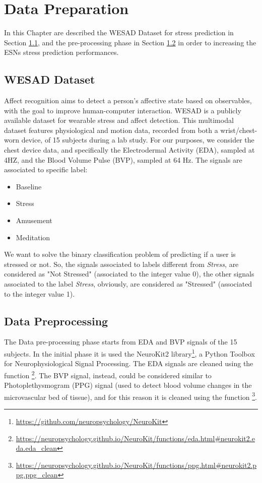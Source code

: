 \chapter{Data Preparation}\label{chapter:dataset}

In this Chapter are described the WESAD Dataset \cite{schmidt2018introducing} for stress prediction in Section \ref{sec:wesad}, and the pre-processing phase in Section \ref{sec:data_preproc} in order to  increasing the ESNs stress prediction performances.


\section{WESAD Dataset}\label{sec:wesad}

Affect recognition aims to detect a person’s affective state based on observables, with the goal to improve human-computer interaction. WESAD is a publicly available dataset for wearable stress and affect detection. This multimodal dataset features physiological and motion data, recorded from both a wrist/chest-worn device, of 15 subjects during a lab study. For our purposes, we consider the chest device data, and specifically the Electrodermal Activity (EDA), sampled at 4HZ, and the Blood Volume Pulse (BVP), sampled at 64 Hz. The signals are associated to specific label:

\begin{itemize}
    \item Baseline
    \item Stress
    \item Amusement
    \item Meditation
\end{itemize}

We want to solve the binary classification problem of predicting if a user is stressed or not. So, the signals associated to labels different from \textit{Stress}, are considered as "Not Stressed" (associated to the integer value 0), the other signals associated to the label \textit{Stress}, obviously, are considered as "Stressed" (associated to the integer value 1).


\section{Data Preprocessing}\label{sec:data_preproc}

The Data pre-processing phase starts from EDA and BVP signals of the 15 subjects. In the initial phase it is used the NeuroKit2 library\footnote{\url{https://github.com/neuropsychology/NeuroKit}}, a Python Toolbox for Neurophysiological Signal Processing. The EDA signals are cleaned using the function \footnote{\url{https://neuropsychology.github.io/NeuroKit/functions/eda.html#neurokit2.eda.eda_clean}}. The BVP signal, instead, could be considered similar to Photoplethysmogram (PPG) signal (used to detect blood volume changes in the microvascular bed of tissue), and for this reason it is cleaned using the function \footnote{\url{https://neuropsychology.github.io/NeuroKit/functions/ppg.html#neurokit2.ppg.ppg_clean}}. \\

